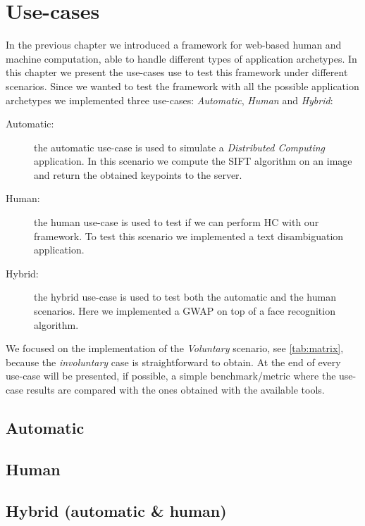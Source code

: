 \chapter{Use-cases}
\label{cap:cases}

In the previous chapter we introduced a framework for web-based human and machine
computation, able to handle different types of application archetypes. In this
chapter we present the use-cases use to test this framework under different
scenarios. Since we wanted to test the framework with all the possible application
archetypes we implemented three use-cases: \emph{Automatic}, \emph{Human} and
\emph{Hybrid}:
\begin{description}
    \item[Automatic:] the automatic use-case is used to simulate a
    \emph{Distributed Computing} application. In this scenario we compute the
    SIFT algorithm on an image and return the obtained keypoints to the server.
    \item[Human:] the human use-case is used to test if we can perform \acl{HC}
    with our framework. To test this scenario we implemented a text disambiguation
    application.
    \item[Hybrid:] the hybrid use-case is used to test both the automatic and the
    human scenarios. Here we implemented a \ac{GWAP} on top of a face recognition
    algorithm.
\end{description}
\noindent We focused on the implementation of the \emph{Voluntary} scenario, see
\autoref{tab:matrix}, because the \emph{involuntary} case is straightforward
to obtain.
At the end of every use-case will be presented, if possible, a simple
benchmark/metric where the use-case results are compared with the ones obtained
with the available tools. 



\section{Automatic}
\label{sec:cases:automatic}


\section{Human}
\label{sec:cases:human}



\section{Hybrid (automatic \& human)}
\label{sec:cases:hybrid}
